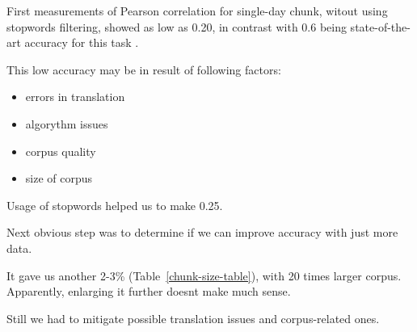 \documentclass[11pt,letterpaper]{article}
\begin{document}
First measurements of Pearson correlation for single-day chunk, witout using stopwords filtering, 
showed as low as 0.20, in contrast with 0.6 being state-of-the-art accuracy 
for this task \cite{mikolov2013efficient}.  


This low accuracy may be in result of following factors:

\begin{itemize}
\item errors in translation 
\item algorythm issues
\item corpus quality
\item size of corpus
\end{itemize}

Usage of stopwords helped us to make 0.25. 

Next obvious step was to determine if we can improve accuracy with just more data.

It gave us another 2-3\% (Table~\ref{chunk-size-table}), with 20 times larger
corpus. Apparently, enlarging it further doesnt make much sense.

Still we had to mitigate possible translation issues and corpus-related ones.
\end{document}
